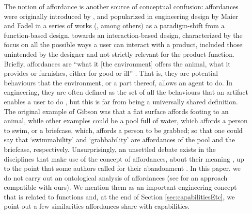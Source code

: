 \documentclass[sw]{iosart2x}
\newcommand{\quotes}[1]{`#1'}
\newcommand{\qquotes}[1]{``#1''}
\begin{document}
The notion of affordance is another source of conceptual confusion:
affordances were originally introduced by \cite{gibsonTheoryAffordances1979}, and popularized in engineering design by Maier and Fadel in a series of works (\cite{maier2001affordance,maierAffordanceBasedDesign2009}, among others) as a paradigm-shift from a function-based design, towards an interaction-based design, characterized by the focus on all the possible ways a user can interact with a product, included those unintended by the designer and not strictly relevant for the product function.
Briefly, affordances are \qquotes{what it [the environment] offers the animal, what it provides or furnishes, either for good or ill} \cite{gibsonTheoryAffordances1979}. That is, they are potential behaviours that the environment, or a part thereof, allows an agent to do. 
In engineering, they are often defined as the set of all the behaviours that an artifact enables a user to do \cite{brownRelationshipFunctionAffordance2005}, but this is far from being a universally shared definition.
The original example of Gibson was that a flat surface affords footing to an animal, while other examples could be a pool full of water, which affords a person to swim, or a briefcase, which, affords a person to be grabbed; so that one could say that \quotes{swimmability} and \quotes{grabbability} are affordances of the pool and the briefcase, respectively.
Unsurprisingly, an unsettled debate exists in the disciplines that make use of the concept of affordances, about their meaning \cite{brownRelationshipFunctionAffordance2005}, up to the point that some authors called for their abandonment \cite{motaDispensingTheoryPhilosophy2021}.
In this paper, we do not carry out an ontological analysis of affordances (see \cite{ortmann2010affordances} for an approach compatible with ours). 
We mention them as an important engineering concept that is related to functions \cite{brownRelationshipFunctionAffordance2005} and, at the end of Section \ref{sec:capabilitiesEtc}, we point out a few similarities affordances share with capabilities.
\end{document}
